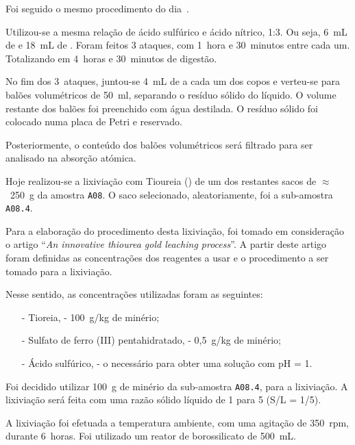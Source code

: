 Foi seguido o mesmo procedimento do dia~.

Utilizou-se a mesma relação de ácido sulfúrico e ácido nítrico, 1:3.
Ou seja, 6~mL de  e 18~mL de .
Foram feitos 3 ataques, com 1~hora e 30~minutos entre cada um.
Totalizando em 4~horas e 30~minutos de digestão.

No fim dos 3~ataques, juntou-se 4~mL de  a cada um dos copos e verteu-se para balões volumétricos de 50~ml, separando o resíduo sólido do líquido.
O volume restante dos balões foi preenchido com água destilada.
O resíduo sólido foi colocado numa placa de Petri e reservado.

Posteriormente, o conteúdo dos balões volumétricos será filtrado para ser analisado na absorção atómica.

\hrulefill



Hoje realizou-se a lixiviação com Tioureia (\tio{}) de um dos restantes sacos de $\approx$~250~g da amostra \texttt{A08}.
O saco selecionado, aleatoriamente, foi a sub-amostra \texttt{A08.4}.

Para a elaboração do procedimento desta lixiviação, foi tomado em consideração o artigo ``\emph{An innovative thiourea gold leaching process}''\cite{innovative_thiourea_1998}.
A partir deste artigo foram definidas as concentrações dos reagentes a usar e o procedimento a ser tomado para a lixiviação.

Nesse sentido, as concentrações utilizadas foram as seguintes:
\begin{itemize}
    \item[-] Tioreia, \tio{} - 100~g/kg de minério;
    \item[-] Sulfato de ferro (III) pentahidratado, \sulfe{} - 0,5~g/kg de minério;
    \item[-] Ácido sulfúrico, \acsul{} - o necessário para obter uma solução com pH = 1.
\end{itemize}

Foi decidido utilizar 100~g de minério da sub-amostra \texttt{A08.4}, para a lixiviação. 
A lixiviação será feita com uma razão sólido líquido de 1 para 5 (S/L = 1/5).

A lixiviação foi efetuada a temperatura ambiente, com uma agitação de 350~rpm, durante 6~horas.
Foi utilizado um reator de borossilicato de 500~mL.

